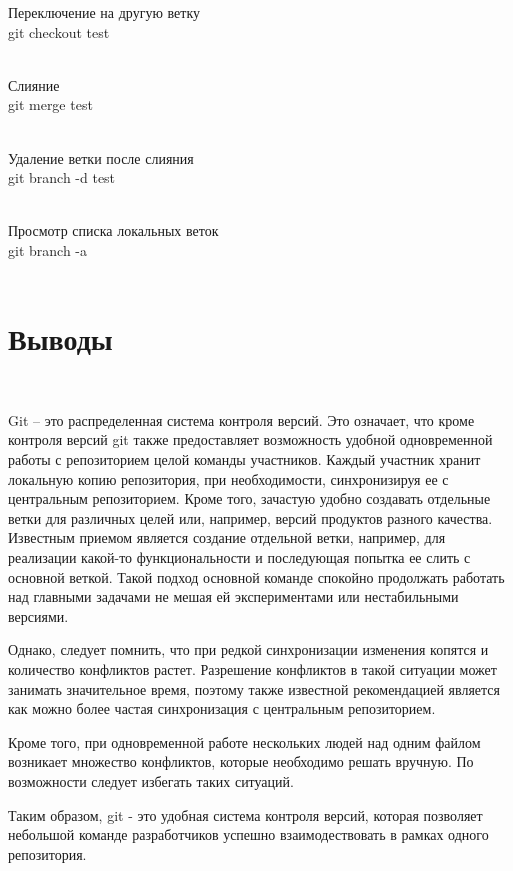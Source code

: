 \documentclass{article}
\begin{document}
Переключение на другую ветку \\
git checkout test \\
~

Слияние \\
git merge test \\
~

Удаление ветки после слияния \\
git branch -d test \\
~

Просмотр списка локальных веток \\
git branch -a \\
~

\section{Выводы}
~

Git -- это распределенная система контроля версий. Это означает, что кроме контроля версий git также предоставляет возможность удобной одновременной работы с репозиторием целой команды участников. Каждый участник хранит локальную копию репозитория, при необходимости, синхронизируя ее с центральным репозиторием. Кроме того, зачастую удобно создавать отдельные ветки для различных целей или, например, версий продуктов разного качества. Известным приемом является создание отдельной ветки, например, для реализации какой-то функциональности и последующая попытка ее слить с основной веткой. Такой подход основной команде спокойно продолжать работать над главными задачами не мешая ей экспериментами или нестабильными версиями.

Однако, следует помнить, что при редкой синхронизации изменения копятся и количество конфликтов растет. Разрешение конфликтов в такой ситуации может занимать значительное время, поэтому также известной рекомендацией является как можно более частая синхронизация с центральным репозиторием.

Кроме того, при одновременной работе нескольких людей над одним файлом возникает множество конфликтов, которые необходимо решать вручную. По возможности следует избегать таких ситуаций.

Таким образом, git - это удобная система контроля версий, которая позволяет небольшой команде разработчиков успешно взаимодествовать в рамках одного репозитория.
\end{document}

